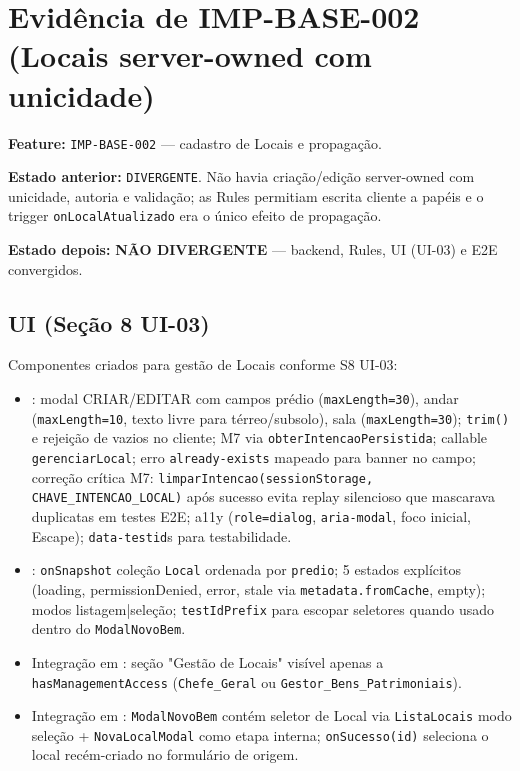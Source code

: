 \section{Evidência de IMP-BASE-002 (Locais server-owned com unicidade)}

\textbf{Feature:} \texttt{IMP-BASE-002} --- cadastro de Locais e propagação.

\textbf{Estado anterior:} \texttt{DIVERGENTE}. Não havia criação/edição
server-owned com unicidade, autoria e validação; as Rules permitiam escrita
cliente a papéis e o trigger \texttt{onLocalAtualizado} era o único efeito de
propagação.

\textbf{Estado depois:} \textbf{NÃO DIVERGENTE} --- backend, Rules, UI (UI-03) e E2E convergidos.

\subsection{UI (Seção 8 UI-03)}

Componentes criados para gestão de Locais conforme S8 UI-03:
\begin{itemize}
  \item {}: modal CRIAR/EDITAR com campos prédio (\texttt{maxLength=30}), andar (\texttt{maxLength=10}, texto livre para térreo/subsolo), sala (\texttt{maxLength=30}); \texttt{trim()} e rejeição de vazios no cliente; M7 via \texttt{obterIntencaoPersistida}; callable \texttt{gerenciarLocal}; erro \texttt{already-exists} mapeado para banner no campo; correção crítica M7: \texttt{limparIntencao(sessionStorage, CHAVE\_INTENCAO\_LOCAL)} após sucesso evita replay silencioso que mascarava duplicatas em testes E2E; a11y (\texttt{role=dialog}, \texttt{aria-modal}, foco inicial, Escape); \texttt{data-testid}s para testabilidade.
  \item {}: \texttt{onSnapshot} coleção \texttt{Local} ordenada por \texttt{predio}; 5 estados explícitos (loading, permissionDenied, error, stale via \texttt{metadata.fromCache}, empty); modos listagem|seleção; \texttt{testIdPrefix} para escopar seletores quando usado dentro do \texttt{ModalNovoBem}.
  \item Integração em : seção "Gestão de Locais" visível apenas a \texttt{hasManagementAccess} (\texttt{Chefe\_Geral} ou \texttt{Gestor\_Bens\_Patrimoniais}).
  \item Integração em : \texttt{ModalNovoBem} contém seletor de Local via \texttt{ListaLocais} modo seleção + \texttt{NovaLocalModal} como etapa interna; \texttt{onSucesso(id)} seleciona o local recém-criado no formulário de origem.
\end{itemize}

